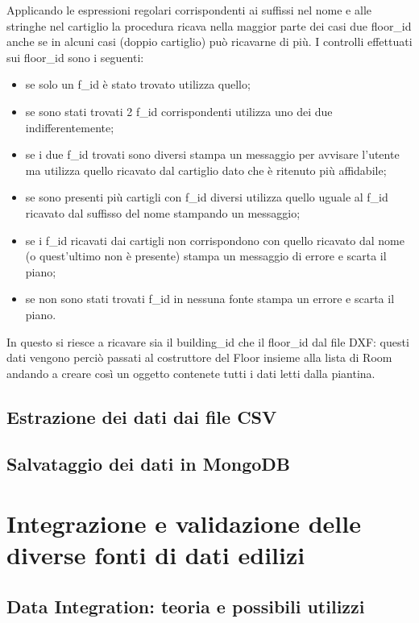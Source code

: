 \documentclass[12pt]{report}
\begin{document}
Applicando le espressioni regolari corrispondenti ai suffissi nel nome e alle stringhe nel cartiglio la procedura ricava nella maggior parte dei casi due floor\_id anche se in alcuni casi (doppio cartiglio) può ricavarne di più. 
I controlli effettuati sui floor\_id sono i seguenti:
\begin{itemize}
\item se solo un f\_id è stato trovato utilizza quello;
\item se sono stati trovati 2 f\_id corrispondenti utilizza uno dei due indifferentemente;
\item se i due f\_id trovati sono diversi stampa un messaggio per avvisare l'utente ma utilizza quello ricavato dal cartiglio dato che è ritenuto più affidabile;
\item se sono presenti più cartigli con f\_id diversi utilizza quello uguale al f\_id ricavato dal suffisso del nome stampando un messaggio;
\item se i f\_id ricavati dai cartigli non corrispondono con quello ricavato dal nome (o quest'ultimo non  è presente) stampa un messaggio di errore e scarta il piano;
\item se non sono stati trovati f\_id in nessuna fonte stampa un errore e scarta il piano.  
\end{itemize}

In questo si riesce a ricavare sia il building\_id che il floor\_id dal file DXF: questi dati vengono perciò passati al costruttore del Floor insieme alla lista di Room andando a creare così un oggetto contenete tutti i dati letti dalla piantina.

\newpage
\section{Estrazione dei dati dai file CSV}

\newpage
\section{Salvataggio dei dati in MongoDB}


\chapter{Integrazione e validazione delle diverse fonti di dati edilizi}
\label{cap2}

\section{Data Integration: teoria e possibili utilizzi}
\end{document}
